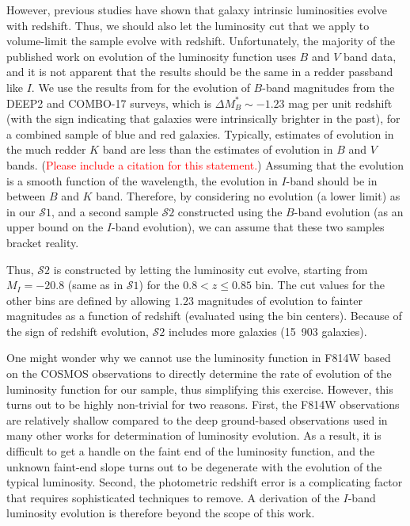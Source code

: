 \documentclass[twocolumn,useAMS,usenatbib]{mn2e}
\newcommand{\rachel}[1]{{\textcolor{red}{#1}}}
\newcommand{\s}{\ensuremath{\mathcal{S}}}
\begin{document}
However, previous studies
\citep[e.g.,][]{2003A&A...401...73W,2005ApJ...622..116G,2006ApJ...647..853W,Faber2007}
have shown that galaxy intrinsic luminosities evolve with
redshift. Thus, we should also let the luminosity cut that we apply to
volume-limit the sample evolve with redshift. 
Unfortunately, the majority of the published work on evolution of the
luminosity function uses $B$ and $V$ band data, and it is not apparent
that the results should be the same in a redder passband like $I$.  
We use the results from \cite{Faber2007} for the evolution of
$B$-band magnitudes from the DEEP2 and COMBO-17 surveys, which is $
\Delta M_B^* \sim -1.23$ mag per unit redshift (with the sign
indicating that galaxies were intrinsically brighter in the past), for a combined sample
of blue and red galaxies. 
Typically, estimates of evolution in the much redder $K$ band are less
than the estimates of evolution in $B$ and $V$ bands. (\rachel{Please
  include a citation for this statement.}) 
Assuming that the evolution is a smooth function of the wavelength,
the evolution in $I$-band should be in between $B$ and $K$ band. 
Therefore, by considering no evolution (a lower limit) as in our \s$1$, and a second
sample \s$2$ constructed using the $B$-band evolution (as an upper
bound on the $I$-band evolution), we can assume that these two samples
bracket reality.

Thus, \s$2$ is constructed by letting the luminosity cut evolve,
starting from $M_I = -20.8$ (same as in \s$1$) for the $0.8<z\le0.85$
bin.  The cut values for the other bins are defined by allowing $1.23$
magnitudes of evolution to fainter magnitudes as a function of
redshift (evaluated using the bin centers).  Because of the sign of
redshift evolution, \s$2$ includes  more galaxies (15~903 galaxies). 

One might wonder why we cannot use the luminosity function in F814W
based on the COSMOS observations to directly determine the rate of evolution of the luminosity
function for our sample, thus simplifying this exercise.  However,
this turns out to be highly non-trivial for two reasons.  First, the
F814W observations are relatively shallow compared to the deep
ground-based observations used in many other works for determination
of luminosity evolution.  As a result, it is difficult to get a handle
on the faint end of the luminosity function, and the unknown faint-end
slope turns out to be degenerate with the evolution of the typical
luminosity.  Second, the photometric redshift error is a complicating
factor that requires sophisticated techniques to remove.  A derivation
of the $I$-band luminosity evolution is therefore beyond the scope of
this work.
\end{document}
